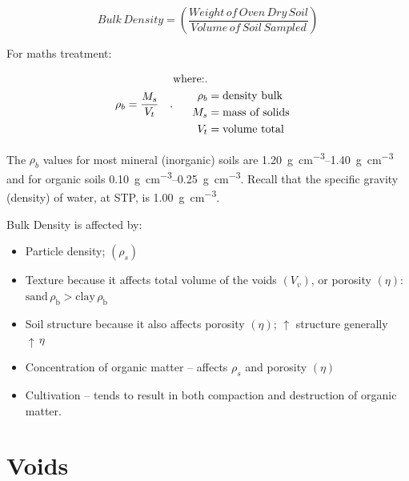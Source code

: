 \documentclass{article}
\begin{document}
\begin{equation}
    Bulk\,Density = \left(\frac{Weight\,of\,Oven\,Dry\,Soil}{Volume\,of\,Soil\,Sampled}\right)
\end{equation}

For maths treatment:

\begin{equation}
    \rho_b = \frac{M_s}{V_t}\quad.    \\
    \begin{aligned}
    \text{where:}.                    \\
        \rho_b &= \text{density bulk} \\
        M_s &= \text{mass of solids}  \\
        V_t &= \text{volume total}    \\
    \end{aligned}
\end{equation}

The $\rho_b$ values for most mineral (inorganic) soils are \qtyrange[range-units = single]{1.20}{1.40}{\gram\per\cubic\cm} and for organic soils \qtyrange[range-units = single]{0.10}{0.25}{\gram\per\cubic\centi\meter}. Recall that the specific gravity (density) of water, at STP, is \qty[per-mode = fraction]{1.00}{\gram\per\cubic\centi\meter}.

Bulk Density is affected by:
\begin{itemize}
    \item Particle density; $\left(\rho_s\right)$
    \item Texture because it affects total volume of the voids $\left(V_v\right)$, or porosity $\left(\eta\right)$:  $\text{sand}\,\rho_{\text{b}} > \text{clay}\,\rho_{\text{b}}$
    \item Soil structure because it also affects porosity $\left(\eta\right)$; $\uparrow$  structure generally $\uparrow\,\eta$
    \item Concentration of organic matter – affects $\rho_s$ and porosity $\left(\eta\right)$
    \item Cultivation – tends to result in both compaction and destruction of organic matter.
\end{itemize}

\section{Voids}
\label{voids}
\end{document}
